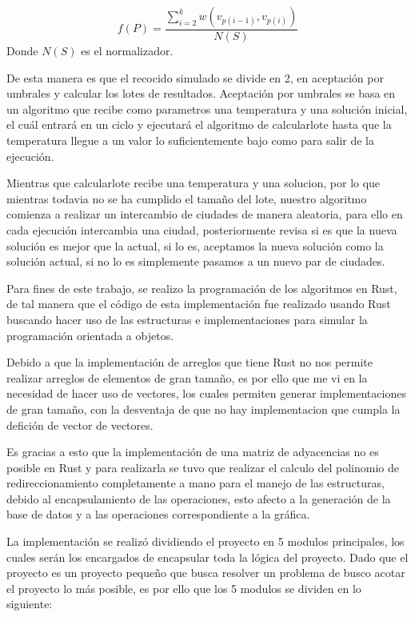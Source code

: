 \begin{multicols}{2}
\[
  f(P) = \frac{\sum^k_{i=2}w(v_{p(i-1)}, v_{p(i)})}{N(S)}
\]
 Donde $N(S)$ es el normalizador. 

 De esta manera es que el recocido simulado se divide en 2, en aceptación por umbrales y calcular los lotes de resultados. Aceptación por umbrales se basa en un algoritmo que recibe como parametros una temperatura y una solución inicial, el cuál entrará en un ciclo y ejecutará el algoritmo de calcularlote hasta que la temperatura llegue a un valor lo suficientemente bajo como para salir de la ejecución.

 Mientras que calcularlote recibe una temperatura y una solucion, por lo que mientras todavia no se ha cumplido el tamaño del lote, nuestro algoritmo comienza a realizar un intercambio de ciudades de manera aleatoria, para ello en cada ejecución intercambia una ciudad, posteriormente revisa si es que la nueva solución es mejor que la actual, si lo es, aceptamos la nueva solución como la solución actual, si no lo es simplemente pasamos a un nuevo par de ciudades.

 Para fines de este trabajo, se realizo la programación de los algoritmos en Rust, de tal manera que el código de esta implementación fue realizado usando Rust buscando hacer uso de las estructuras e implementaciones para simular la programación orientada a objetos.

 Debido a que la implementación de arreglos que tiene Rust no nos permite realizar arreglos de elementos de gran tamaño, es por ello que me vi en la necesidad de hacer uso de vectores, los cuales permiten generar implementaciones de gran tamaño, con la desventaja de que no hay implementacion que cumpla la defición de vector de vectores.

 Es gracias a esto que la implementación de una matriz de adyacencias no es posible en Rust y para realizarla se tuvo que realizar el calculo del polinomio de redireccionamiento completamente a mano para el manejo de las estructuras, debido al encapsulamiento de las operaciones, esto afecto a la generación de la base de datos y a las operaciones correspondiente a la gráfica. 
 
 La implementación se realizó dividiendo el proyecto en 5 modulos principales, los cuales serán los encargados de encapsular toda la lógica del proyecto. Dado que el proyecto es un proyecto pequeño que busca resolver un problema de busco acotar el proyecto lo más posible, es por ello que los 5 modulos se dividen en lo siguiente:

 \begin{itemize}


\end{itemize}
\end{multicols}
